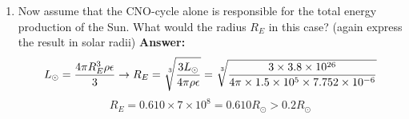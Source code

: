 \documentclass[11pt]{scrartcl}
\begin{document}
{\begin{enumerate}[label=(\alph*)]
extends to about $0.2R_\odot$ . How well did your estimate of $R_E$ agree with the radius of the solar core?
\newline \textbf{Answer: }
\begin{equation}
    L_\odot = \frac{4\pi R^3_E \rho \epsilon}{3} \rightarrow R_E = \sqrt[\leftroot{-2}\uproot{2}3]{\frac{3L_\odot}{4 \pi \rho \epsilon}} = \sqrt[\leftroot{-2}\uproot{2}3]{\frac{3 \times 3.8 \times 10^{26} }{4 \pi \times 1.5 \times 10^5 \times 5.039 \times 10^{-4}}}
\end{equation}
\begin{equation}
    R_E = 0.152 \times 7 \times 10^8 = 0.152R_\odot < 0.2R_\odot 
\end{equation}
Therefore the estimation agrees with the radius of the solar core.
\item Now assume that the CNO-cycle alone is responsible for the total energy production of the Sun. What would the radius $R_E$ in this case? (again express the result in solar radii)
\newline \textbf{Answer: }
\begin{equation}
    L_\odot = \frac{4\pi R^3_E \rho \epsilon}{3} \rightarrow R_E = \sqrt[\leftroot{-2}\uproot{2}3]{\frac{3L_\odot}{4 \pi \rho \epsilon}} = \sqrt[\leftroot{-2}\uproot{2}3]{\frac{3 \times 3.8 \times 10^{26} }{4 \pi \times 1.5 \times 10^5 \times 7.752 \times 10^{-6}}}
\end{equation}
\begin{equation}
    R_E = 0.610 \times 7 \times 10^8 = 0.610R_\odot > 0.2R_\odot 
\end{equation}
\end{enumerate}
\newpage
}
\end{document}
